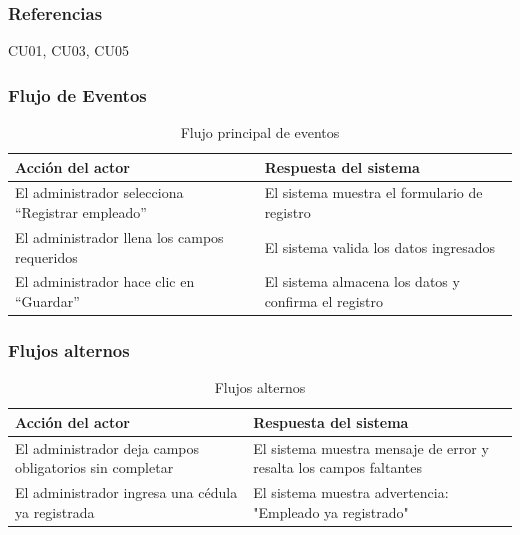 \subsubsection*{Referencias}
CU01, CU03, CU05

\clearpage

\subsubsection*{Flujo de Eventos}
\begin{table}[h]
	\centering
	\caption{Flujo principal de eventos}
	\begin{tabular}{|p{7cm}|p{7cm}|}
		\hline
		\textbf{Acción del actor}                        & \textbf{Respuesta del sistema}                       \\ \hline
		El administrador selecciona “Registrar empleado” & El sistema muestra el formulario de registro         \\ \hline
		El administrador llena los campos requeridos     & El sistema valida los datos ingresados               \\ \hline
		El administrador hace clic en “Guardar”          & El sistema almacena los datos y confirma el registro \\ \hline
	\end{tabular}
\end{table}

\subsubsection*{Flujos alternos}
\begin{table}[h]
	\centering
	\caption{Flujos alternos}
	\begin{tabular}{|p{7cm}|p{7cm}|}
		\hline
		\textbf{Acción del actor}                               & \textbf{Respuesta del sistema}                                     \\ \hline
		El administrador deja campos obligatorios sin completar & El sistema muestra mensaje de error y resalta los campos faltantes \\ \hline
		El administrador ingresa una cédula ya registrada       & El sistema muestra advertencia: "Empleado ya registrado"           \\ \hline
	\end{tabular}
\end{table}

